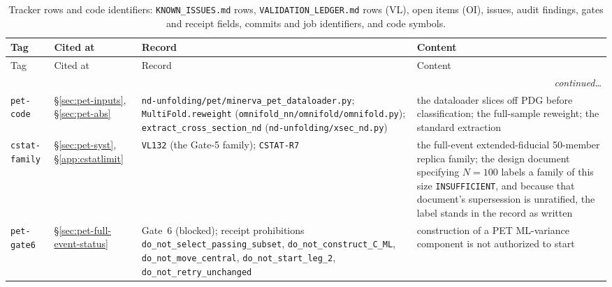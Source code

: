 {\small
\begin{longtable}{@{}llp{}p{}@{}}
\caption{Tracker rows and code identifiers: \texttt{KNOWN\_ISSUES.md} rows,
\texttt{VALIDATION\_LEDGER.md} rows (VL), open items (OI), issues, audit findings,
gates and receipt fields, commits and job identifiers, and code symbols.}\label{tab:prov-pet-trackers}\\
\toprule
Tag & Cited at & Record & Content \\
\midrule
\endfirsthead
\toprule
Tag & Cited at & Record & Content \\
\midrule
\endhead
\midrule \multicolumn{4}{r}{\emph{continued\ldots}}\\ \endfoot
\bottomrule
\endlastfoot
\texttt{pet-code} & \S\ref{sec:pet-inputs}, \S\ref{sec:pet-abs} &
  \texttt{nd-unfolding/pet/}\allowbreak\texttt{minerva\_pet\_dataloader.py}; \texttt{MultiFold.reweight}
  (\texttt{omnifold\_nn/omnifold/}\allowbreak\texttt{omnifold.py}); \texttt{extract\_cross\_section\_nd}
  (\texttt{nd-unfolding/xsec\_nd.py}) &
  the dataloader slices off PDG before classification; the full-sample reweight;
  the standard extraction \\
\texttt{cstat-family} & \S\ref{sec:pet-syst}, \S\ref{app:cstatlimit} &
  \texttt{VL132} (the Gate-5 family); \texttt{CSTAT-R7} &
  the full-event extended-fiducial 50-member replica family; the design document specifying
  $N=100$ labels a family of this size \texttt{INSUFFICIENT}, and because that document's
  supersession is unratified, the label stands in the record as written \\
\texttt{pet-gate6} & \S\ref{sec:pet-full-event-status} &
  Gate~6 (blocked); receipt prohibitions \texttt{do\_not\_select\_passing\_subset},
  \texttt{do\_not\_construct\_C\_ML}, \texttt{do\_not\_move\_central},
  \texttt{do\_not\_start\_leg\_2}, \texttt{do\_not\_retry\_unchanged} &
  construction of a PET ML-variance component is not authorized to start \\
\end{longtable}
}
